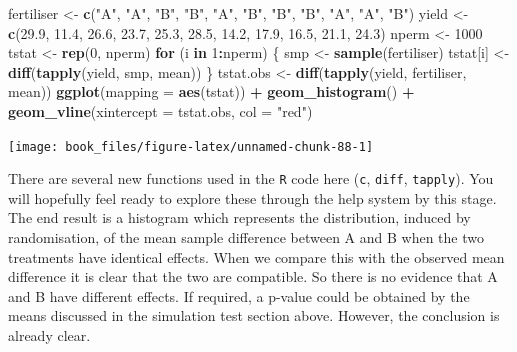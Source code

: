 \documentclass[
]{book}
\newenvironment{Shaded}{\begin{snugshade}}{\end{snugshade}}
\newcommand{\AttributeTok}[1]{\textcolor[rgb]{0.13,0.29,0.53}{#1}}
\newcommand{\ControlFlowTok}[1]{\textcolor[rgb]{0.13,0.29,0.53}{\textbf{#1}}}
\newcommand{\DecValTok}[1]{\textcolor[rgb]{0.00,0.00,0.81}{#1}}
\newcommand{\FloatTok}[1]{\textcolor[rgb]{0.00,0.00,0.81}{#1}}
\newcommand{\FunctionTok}[1]{\textcolor[rgb]{0.13,0.29,0.53}{\textbf{#1}}}
\newcommand{\NormalTok}[1]{#1}
\newcommand{\OtherTok}[1]{\textcolor[rgb]{0.56,0.35,0.01}{#1}}
\newcommand{\SpecialCharTok}[1]{\textcolor[rgb]{0.81,0.36,0.00}{\textbf{#1}}}
\newcommand{\StringTok}[1]{\textcolor[rgb]{0.31,0.60,0.02}{#1}}
\begin{document}
\begin{Shaded}
\begin{Highlighting}[]
\NormalTok{fertiliser }\OtherTok{\textless{}{-}} \FunctionTok{c}\NormalTok{(}\StringTok{"A"}\NormalTok{, }\StringTok{"A"}\NormalTok{, }\StringTok{"B"}\NormalTok{, }\StringTok{"B"}\NormalTok{, }\StringTok{"A"}\NormalTok{, }\StringTok{"B"}\NormalTok{, }\StringTok{"B"}\NormalTok{, }\StringTok{"B"}\NormalTok{, }\StringTok{"A"}\NormalTok{, }\StringTok{"A"}\NormalTok{, }\StringTok{"B"}\NormalTok{)}
\NormalTok{yield      }\OtherTok{\textless{}{-}} \FunctionTok{c}\NormalTok{(}\FloatTok{29.9}\NormalTok{, }\FloatTok{11.4}\NormalTok{, }\FloatTok{26.6}\NormalTok{, }\FloatTok{23.7}\NormalTok{, }\FloatTok{25.3}\NormalTok{, }\FloatTok{28.5}\NormalTok{, }\FloatTok{14.2}\NormalTok{, }\FloatTok{17.9}\NormalTok{, }\FloatTok{16.5}\NormalTok{, }\FloatTok{21.1}\NormalTok{, }\FloatTok{24.3}\NormalTok{)}
\NormalTok{nperm      }\OtherTok{\textless{}{-}} \DecValTok{1000}
\NormalTok{tstat      }\OtherTok{\textless{}{-}} \FunctionTok{rep}\NormalTok{(}\DecValTok{0}\NormalTok{, nperm)}
\ControlFlowTok{for}\NormalTok{ (i }\ControlFlowTok{in} \DecValTok{1}\SpecialCharTok{:}\NormalTok{nperm) \{}
\NormalTok{  smp      }\OtherTok{\textless{}{-}} \FunctionTok{sample}\NormalTok{(fertiliser)}
\NormalTok{  tstat[i] }\OtherTok{\textless{}{-}} \FunctionTok{diff}\NormalTok{(}\FunctionTok{tapply}\NormalTok{(yield, smp, mean))}
\NormalTok{\}}
\NormalTok{tstat.obs }\OtherTok{\textless{}{-}} \FunctionTok{diff}\NormalTok{(}\FunctionTok{tapply}\NormalTok{(yield, fertiliser, mean))}
\FunctionTok{ggplot}\NormalTok{(}\AttributeTok{mapping =} \FunctionTok{aes}\NormalTok{(tstat)) }\SpecialCharTok{+} \FunctionTok{geom\_histogram}\NormalTok{() }\SpecialCharTok{+}
   \FunctionTok{geom\_vline}\NormalTok{(}\AttributeTok{xintercept =}\NormalTok{ tstat.obs, }\AttributeTok{col =} \StringTok{"red"}\NormalTok{)}
\end{Highlighting}
\end{Shaded}

\begin{center}\texttt{[image: book\_files/figure-latex/unnamed-chunk-88-1]} \end{center}

There are several new functions used in the \texttt{R} code here (\texttt{c}, \texttt{diff}, \texttt{tapply}). You will hopefully feel ready to explore these through the help system by this stage. The end result is a histogram which represents the distribution, induced by randomisation, of the mean sample difference between A and B when the two treatments have identical effects. When we compare this with the observed mean difference it is clear that the two are compatible. So there is no evidence that A and B have different effects. If required, a p-value could be obtained by the means discussed in the simulation test section above. However, the conclusion is already clear.
\end{document}
